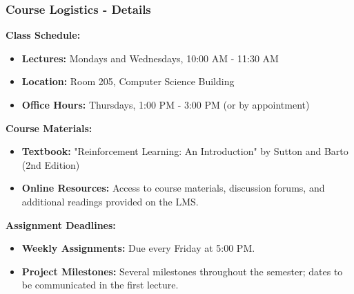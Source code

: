 \documentclass[aspectratio=169]{beamer}
\begin{document}
\begin{frame}[fragile]
  \frametitle{Course Logistics - Details}
  \textbf{Class Schedule:}
  \begin{itemize}
    \item \textbf{Lectures:} Mondays and Wednesdays, 10:00 AM - 11:30 AM
    \item \textbf{Location:} Room 205, Computer Science Building
    \item \textbf{Office Hours:} Thursdays, 1:00 PM - 3:00 PM (or by appointment)
  \end{itemize}

  \textbf{Course Materials:}
  \begin{itemize}
    \item \textbf{Textbook:} "Reinforcement Learning: An Introduction" by Sutton and Barto (2nd Edition)
    \item \textbf{Online Resources:} Access to course materials, discussion forums, and additional readings provided on the LMS.
  \end{itemize}

  \textbf{Assignment Deadlines:}
  \begin{itemize}
    \item \textbf{Weekly Assignments:} Due every Friday at 5:00 PM.
    \item \textbf{Project Milestones:} Several milestones throughout the semester; dates to be communicated in the first lecture.
  \end{itemize}
\end{frame}
\end{document}
